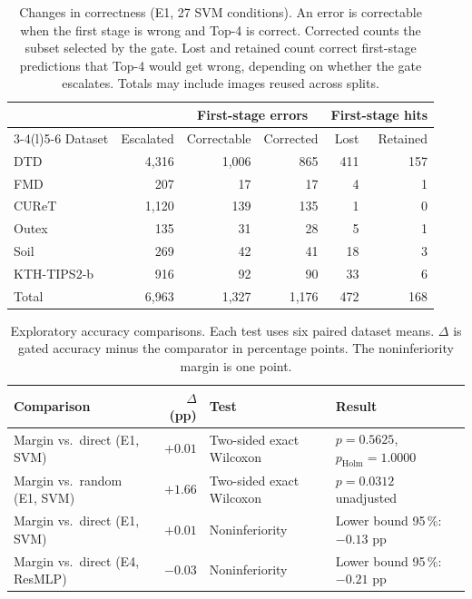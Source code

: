 \documentclass[10pt,a4paper,fleqn]{article}
\begin{document}
\begin{table}[htbp]
\centering
\caption{Changes in correctness (E1, 27 SVM conditions). An error is correctable when the first stage is wrong and Top-4 is correct. Corrected counts the subset selected by the gate. Lost and retained count correct first-stage predictions that Top-4 would get wrong, depending on whether the gate escalates. Totals may include images reused across splits.}
\label{tab:e1-cambios}
\begin{tabular}{@{}lrrrrr@{}}
\toprule
 & & \multicolumn{2}{c}{First-stage errors} & \multicolumn{2}{c}{First-stage hits} \\
\cmidrule(lr){3-4}\cmidrule(l){5-6}
Dataset & Escalated & Correctable & Corrected & Lost & Retained \\
\midrule
DTD & 4,316 & 1,006 & 865 & 411 & 157 \\
FMD & 207 & 17 & 17 & 4 & 1 \\
CUReT & 1,120 & 139 & 135 & 1 & 0 \\
Outex & 135 & 31 & 28 & 5 & 1 \\
Soil & 269 & 42 & 41 & 18 & 3 \\
KTH-TIPS2-b & 916 & 92 & 90 & 33 & 6 \\
\midrule
Total & 6,963 & 1,327 & 1,176 & 472 & 168 \\
\bottomrule
\end{tabular}
\end{table}
\begin{table}[htbp]
\centering
\caption{Exploratory accuracy comparisons. Each test uses six paired dataset means. $\Delta$ is gated accuracy minus the comparator in percentage points. The noninferiority margin is one point.}
\label{tab:contrastes-margen}
\setlength{\tabcolsep}{4pt}
\begin{tabular}{@{}p{}rp{}p{}@{}}
\toprule
Comparison & $\Delta$ (pp) & Test & Result \\
\midrule
Margin vs.\ direct (E1, SVM) & $+0.01$ & Two-sided exact Wilcoxon & $p=0.5625$, $p_{\mathrm{Holm}}=1.0000$ \\
\addlinespace
Margin vs.\ random (E1, SVM) & $+1.66$ & Two-sided exact Wilcoxon & $p=0.0312$ unadjusted \\
\addlinespace
Margin vs.\ direct (E1, SVM) & $+0.01$ & Noninferiority & Lower bound 95\,\%: $-0.13$ pp \\
\addlinespace
Margin vs.\ direct (E4, ResMLP) & $-0.03$ & Noninferiority & Lower bound 95\,\%: $-0.21$ pp \\
\bottomrule
\end{tabular}
\end{table}
\end{document}
